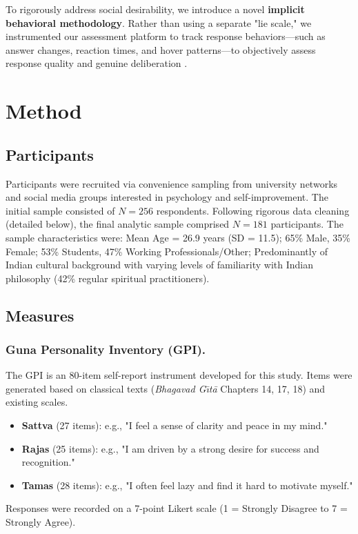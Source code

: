 \documentclass[runningheads]{llncs}
\begin{document}
To rigorously address social desirability, we introduce a novel \textbf{implicit behavioral methodology}. Rather than using a separate "lie scale," we instrumented our assessment platform to track response behaviors---such as answer changes, reaction times, and hover patterns---to objectively assess response quality and genuine deliberation \cite{paulhus1991}.

\section{Method}

\subsection{Participants}
Participants were recruited via convenience sampling from university networks and social media groups interested in psychology and self-improvement. The initial sample consisted of $N = 256$ respondents. Following rigorous data cleaning (detailed below), the final analytic sample comprised $N = 181$ participants. The sample characteristics were: Mean Age = 26.9 years (SD = 11.5); 65\% Male, 35\% Female; 53\% Students, 47\% Working Professionals/Other; Predominantly of Indian cultural background with varying levels of familiarity with Indian philosophy (42\% regular spiritual practitioners).

\subsection{Measures}

\subsubsection{Guna Personality Inventory (GPI).}
The GPI is an 80-item self-report instrument developed for this study. Items were generated based on classical texts (\textit{Bhagavad G\={\i}t\={a}} Chapters 14, 17, 18) and existing scales.
\begin{itemize}
    \item \textbf{Sattva} (27 items): e.g., "I feel a sense of clarity and peace in my mind."
    \item \textbf{Rajas} (25 items): e.g., "I am driven by a strong desire for success and recognition."
    \item \textbf{Tamas} (28 items): e.g., "I often feel lazy and find it hard to motivate myself."
\end{itemize}
Responses were recorded on a 7-point Likert scale (1 = Strongly Disagree to 7 = Strongly Agree).
\end{document}
